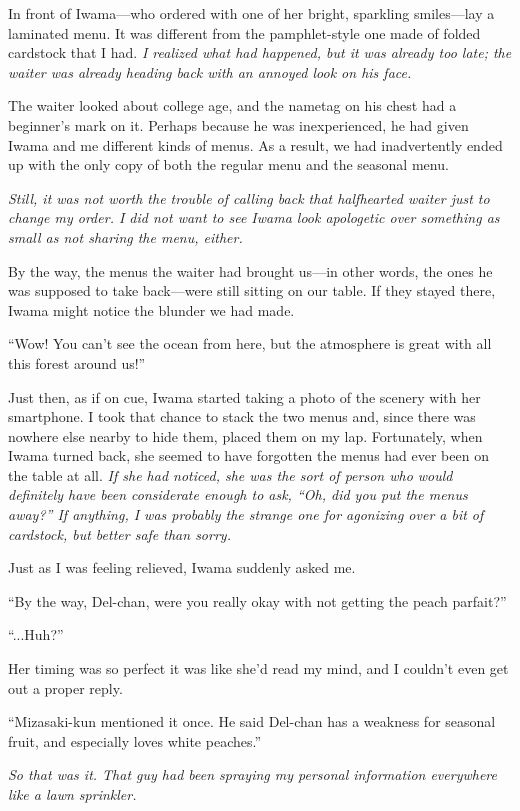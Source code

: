 \documentclass[
    a4paper,
    12pt,
    twoside,
    openany,
    UTF8,
    fontset=windows
]{ctexbook}
\begin{document}
In front of Iwama---who ordered with one of her bright, sparkling smiles---lay a laminated menu. It was different from the pamphlet-style one made of folded cardstock that I had. \textit{I realized what had happened, but it was already too late; the waiter was already heading back with an annoyed look on his face.}

The waiter looked about college age, and the nametag on his chest had a beginner's mark on it. Perhaps because he was inexperienced, he had given Iwama and me different kinds of menus. As a result, we had inadvertently ended up with the only copy of both the regular menu and the seasonal menu.

\textit{Still, it was not worth the trouble of calling back that halfhearted waiter just to change my order. I did not want to see Iwama look apologetic over something as small as not sharing the menu, either.}

By the way, the menus the waiter had brought us---in other words, the ones he was supposed to take back---were still sitting on our table. If they stayed there, Iwama might notice the blunder we had made.

``Wow! You can't see the ocean from here, but the atmosphere is great with all this forest around us!''

Just then, as if on cue, Iwama started taking a photo of the scenery with her smartphone. I took that chance to stack the two menus and, since there was nowhere else nearby to hide them, placed them on my lap. Fortunately, when Iwama turned back, she seemed to have forgotten the menus had ever been on the table at all. \textit{If she had noticed, she was the sort of person who would definitely have been considerate enough to ask, ``Oh, did you put the menus away?'' If anything, I was probably the strange one for agonizing over a bit of cardstock, but better safe than sorry.}

Just as I was feeling relieved, Iwama suddenly asked me.

``By the way, Del-chan, were you really okay with not getting the peach parfait?''

``...Huh?''

Her timing was so perfect it was like she'd read my mind, and I couldn't even get out a proper reply.

``Mizasaki-kun mentioned it once. He said Del-chan has a weakness for seasonal fruit, and especially loves white peaches.''

\textit{So that was it. That guy had been spraying my personal information everywhere like a lawn sprinkler.}
\end{document}
